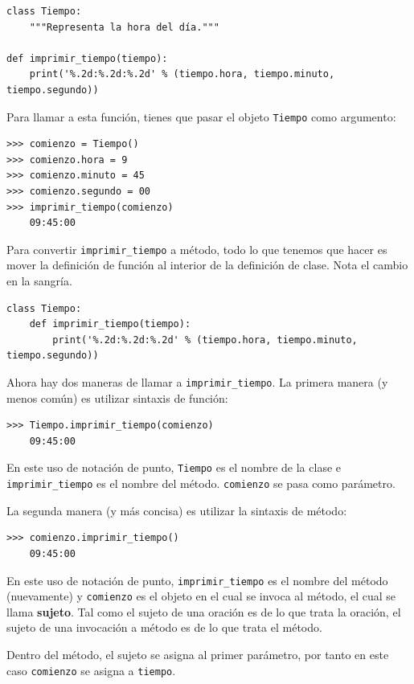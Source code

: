 \documentclass[10pt]{book}
\begin{document}
\begin{verbatim}
class Tiempo:
    """Representa la hora del día."""

def imprimir_tiempo(tiempo):
    print('%.2d:%.2d:%.2d' % (tiempo.hora, tiempo.minuto, tiempo.segundo))
\end{verbatim}
%
Para llamar a esta función, tienes que pasar el objeto {\tt Tiempo} como
argumento:

\begin{verbatim}
>>> comienzo = Tiempo()
>>> comienzo.hora = 9
>>> comienzo.minuto = 45
>>> comienzo.segundo = 00
>>> imprimir_tiempo(comienzo)
    09:45:00
\end{verbatim}
%
Para convertir \verb"imprimir_tiempo" a método, todo lo que tenemos que hacer es
mover la definición de función al interior de la definición de clase.  Nota
el cambio en la sangría.

\begin{verbatim}
class Tiempo:
    def imprimir_tiempo(tiempo):
        print('%.2d:%.2d:%.2d' % (tiempo.hora, tiempo.minuto, tiempo.segundo))
\end{verbatim}
%
Ahora hay dos maneras de llamar a \verb"imprimir_tiempo".  La primera manera
(y menos común) es utilizar sintaxis de función:

\begin{verbatim}
>>> Tiempo.imprimir_tiempo(comienzo)
    09:45:00
\end{verbatim}
%
En este uso de notación de punto, {\tt Tiempo} es el nombre de la clase
e \verb"imprimir_tiempo" es el nombre del método.  {\tt comienzo} se
pasa como parámetro.

La segunda manera (y más concisa) es utilizar la sintaxis de método:

\begin{verbatim}
>>> comienzo.imprimir_tiempo()
    09:45:00
\end{verbatim}
%
En este uso de notación de punto, \verb"imprimir_tiempo" es el nombre del
método (nuevamente) y {\tt comienzo} es el objeto en el cual se invoca
al método, el cual se llama {\bf sujeto}.  Tal como el
sujeto de una oración es de lo que trata la oración, el sujeto
de una invocación a método es de lo que trata el método.

Dentro del método, el sujeto se asigna al primer
parámetro, por tanto en este caso {\tt comienzo} se asigna
a {\tt tiempo}.
\end{document}
